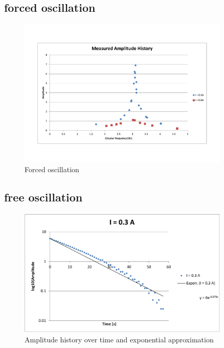 \documentclass{scrreprt}
\begin{document}
\subsection{forced oscillation}
\begin{figure}[H]
	\centering
  \includegraphics[width=0.9\textwidth]{diag/measurements_amplitudes.pdf}
	\caption{Forced oscillation}
	\label{fig:forcedoscillation}
\end{figure}

\subsection{free oscillation}
\begin{figure}[H]
	\centering
  \includegraphics[width=0.9\textwidth]{diag/3A.pdf}
	\caption{Amplitude history over time and exponential approximation}
	\label{fig:0.3A}
\end{figure}
\end{document}
